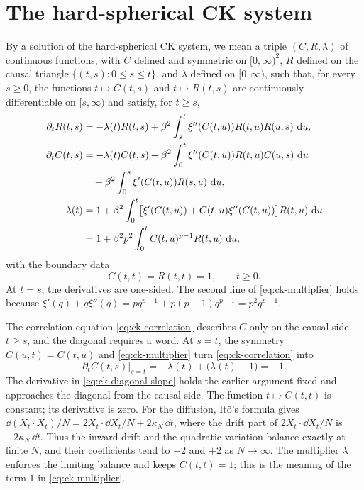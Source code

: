 \section{The hard-spherical CK system}\label{sec:hard-ck}

By a solution of the hard-spherical CK system, we mean a triple $(C,R,\lambda)$ of continuous functions, with $C$ defined and symmetric on $[0,\infty)^2$, $R$ defined on the causal triangle $\{(t,s):0\le s\le t\}$, and $\lambda$ defined on $[0,\infty)$, such that, for every $s\ge0$, the functions $t\mapsto C(t,s)$ and $t\mapsto R(t,s)$ are continuously differentiable on $[s,\infty)$ and satisfy, for $t\ge s$,
\begin{align}
 \partial_tR(t,s)&=-\lambda(t)R(t,s)
 +\beta^2\int_s^t\xi''(C(t,u))R(t,u)R(u,s)\,\mathop{}\!\mathrm d u,
 \label{eq:ck-response}\\
 \partial_tC(t,s)&=-\lambda(t)C(t,s)
 +\beta^2\int_0^t\xi''(C(t,u))R(t,u)C(u,s)\,\mathop{}\!\mathrm d u\notag\\
 &\hspace{1em}+\beta^2\int_0^s\xi'(C(t,u))R(s,u)\,\mathop{}\!\mathrm d u,
 \label{eq:ck-correlation}\\
 \lambda(t)&=1+\beta^2\int_0^t
 \bigl[\xi'(C(t,u))+C(t,u)\xi''(C(t,u))\bigr]R(t,u)\,\mathop{}\!\mathrm d u\notag\\
 &=1+\beta^2p^2\int_0^tC(t,u)^{p-1}R(t,u)\,\mathop{}\!\mathrm d u,
 \label{eq:ck-multiplier}
\end{align}
with the boundary data
\begin{equation}\label{eq:ck-boundary}
 C(t,t)=R(t,t)=1,\qquad t\ge0.
\end{equation}
At $t=s$, the derivatives are one-sided. The second line of \eqref{eq:ck-multiplier} holds because $\xi'(q)+q\xi''(q)=pq^{p-1}+p(p-1)q^{p-1}=p^2q^{p-1}$.

The correlation equation \eqref{eq:ck-correlation} describes $C$ only on the causal side $t\ge s$, and the diagonal requires a word. At $s=t$, the symmetry $C(u,t)=C(t,u)$ and \eqref{eq:ck-multiplier} turn \eqref{eq:ck-correlation} into
\begin{equation}\label{eq:ck-diagonal-slope}
 \partial_tC(t,s)\big|_{s=t}=-\lambda(t)+\bigl(\lambda(t)-1\bigr)=-1.
\end{equation}
The derivative in \eqref{eq:ck-diagonal-slope} holds the earlier argument fixed and approaches the diagonal from the causal side. The function $t\mapsto C(t,t)$ is constant; its derivative is zero. For the diffusion, It\^o's formula gives $\dd(X_t\cdot X_t)/N=2X_t\cdot\dd X_t/N+2\kappa_N\,\dd t$, where the drift part of $2X_t\cdot\dd X_t/N$ is $-2\kappa_N\,\dd t$. Thus the inward drift and the quadratic variation balance exactly at finite $N$, and their coefficients tend to $-2$ and $+2$ as $N\to\infty$. The multiplier $\lambda$ enforces the limiting balance and keeps $C(t,t)=1$; this is the meaning of the term $1$ in \eqref{eq:ck-multiplier}.

